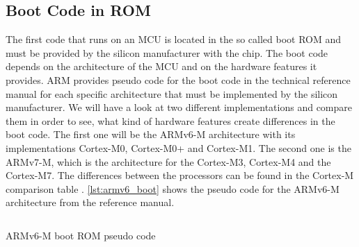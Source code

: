\documentclass[a4paper,12pt]{article}
\begin{document}
\subsection{Boot Code in \ac{ROM}}\label{sec:bootRom}
The first code that runs on an MCU is located in the so called boot \ac{ROM} and must be provided by the silicon manufacturer with the chip. The boot code depends on the architecture of the \ac{MCU} and on the hardware features it provides. ARM provides pseudo code for the boot code in the technical reference manual for each specific architecture that must be implemented by the silicon manufacturer. We will have a look at two different implementations and compare them in order to see, what kind of hardware features create differences in the boot code. The first one will be the ARMv6-M architecture with its implementations Cortex-M0, Cortex-M0+ and Cortex-M1. The second one is the ARMv7-M, which is the architecture for the Cortex-M3, Cortex-M4 and the Cortex-M7. The differences between the processors can be found in the Cortex-M comparison table \cite{ArmDevGuideCortexMCompTable}. \autoref{lst:armv6_boot} shows the pseudo code for the ARMv6-M architecture from the reference manual.

\begin{listing}[H]
  \inputminted{c}{code/armv6_reset_pseudo.txt}
  \caption{ARMv6-M boot \ac{ROM} pseudo code \cite{ARMv6-MRefManual}}
  \label{lst:armv6_boot}
\end{listing}
\end{document}
